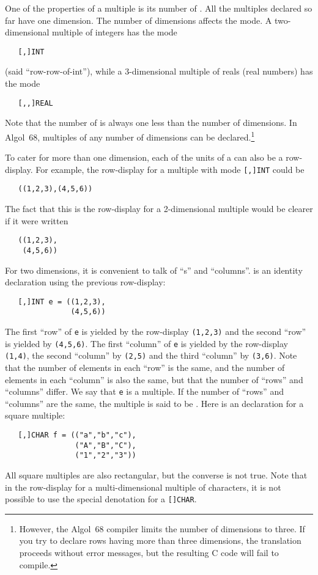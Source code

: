One of the properties of a multiple is its number of
. All the multiples declared so far have one
dimension. The number of dimensions affects the mode.  A
two-dimensional multiple of integers has the mode
\begin{verbatim}
   [,]INT
\end{verbatim}
\noindent
(said ``row-row-of-int''), while a 3-dimensional multiple of reals
(real numbers) has the mode
\begin{verbatim}
   [,,]REAL
\end{verbatim}
\noindent
Note that the number of  is always one
less than the number of dimensions. In Algol~68, multiples of any
number of dimensions can be declared.\footnote{However, the
\protect{} Algol~68 compiler limits the
number of dimensions to three. If you try to declare rows having more
than three dimensions, the translation proceeds without error
messages, but the resulting C code will fail to compile.}

To cater for more than one dimension, each of the units of a
 can also be a row-display. For example,
the row-display for a multiple with mode \verb|[,]INT| could be
\begin{verbatim}
   ((1,2,3),(4,5,6))
\end{verbatim}
\noindent
The fact that this is the row-display for a 2-dimensional multiple
would be clearer if it were written
\begin{verbatim}
   ((1,2,3),
    (4,5,6))
\end{verbatim}
\noindent
For two dimensions, it is convenient to talk of ``s'' and
``columns''.  is an identity declaration using
the previous row-display:
\begin{verbatim}
   [,]INT e = ((1,2,3),
               (4,5,6))
\end{verbatim}
\noindent
The first ``row'' of \verb|e| is yielded by the row-display
\verb|(1,2,3)| and the second ``row'' is yielded by \verb|(4,5,6)|.
The first ``column'' of \verb|e| is yielded by the row-display
\verb|(1,4)|, the second ``column'' by \verb|(2,5)| and the third
``column'' by \verb|(3,6)|.  Note that the number of elements in each
``row'' is the same, and the number of elements in each ``column'' is
also the same, but that the number of ``rows'' and ``columns''
differ.  We say that \verb|e| is a
 multiple. If
the number of ``rows'' and ``columns'' are the same, the multiple is
said to be .  Here is an
 declaration for a square
multiple:
\begin{verbatim}
   [,]CHAR f = (("a","b","c"),
                ("A","B","C"),
                ("1","2","3"))
\end{verbatim}
\noindent
All square multiples are also rectangular, but the converse is not
true. Note that in the row-display for a multi-dimensional multiple
of characters, it is not possible to use the special denotation for a
\verb|[]CHAR|.

